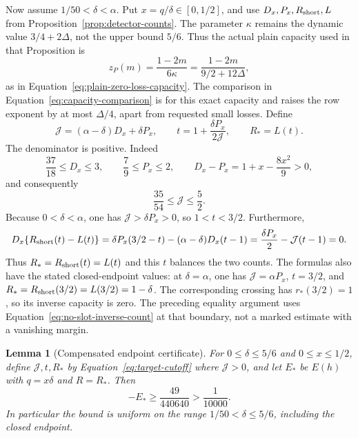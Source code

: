\documentclass[11pt,a4paper]{article}
\numberwithin{equation}{section}
\numberwithin{figure}{section}
\newtheorem{lemma}[theorem]{Lemma}
\theoremstyle{definition}
\theoremstyle{remark}
\begin{document}
Now assume \(1/50<\delta<\alpha\).  Put \(x=q/\delta\in[0,1/2]\),
and use \(D_x,P_x,R_{\rm short},L\) from
Proposition~\ref{prop:detector-counts}.  The parameter \(\kappa\)
remains the dynamic value \(3/4+2\Delta\), not the upper bound
\(5/6\).  Thus the actual plain capacity used in that Proposition is
\[
 z_P(m)=\frac{1-2m}{6\kappa}
       =\frac{1-2m}{9/2+12\Delta},
\]
as in Equation~\eqref{eq:plain-zero-loss-capacity}.  The comparison in
Equation~\eqref{eq:capacity-comparison} is for this exact capacity and
raises the row exponent by at most \(\Delta/4\), apart from requested
small losses.  Define
\begin{equation}
 \mathcal J=(\alpha-\delta)D_x+\delta P_x,\qquad
 t=1+\frac{\delta P_x}{2\mathcal J},\qquad
 R_*=L(t).
 \label{eq:target-cutoff}
\end{equation}
The denominator is positive.  Indeed
\[
 \frac{37}{18}\le D_x\le3,\qquad
 \frac79\le P_x\le2,\qquad
 D_x-P_x=1+x-\frac{8x^2}{9}>0,
\]
and consequently
\[
 \frac{35}{54}\le\mathcal J\le\frac52.
\]
Because \(0<\delta<\alpha\), one has
\(\mathcal J>\delta P_x>0\), so \(1<t<3/2\).
Furthermore,
\[
 D_x\{R_{\rm short}(t)-L(t)\}
 =\delta P_x(3/2-t)-(\alpha-\delta)D_x(t-1)
 =\frac{\delta P_x}{2}-\mathcal J(t-1)=0.
\]
Thus \(R_*=R_{\rm short}(t)=L(t)\) and this \(t\) balances the two counts.
The formulas also have the stated closed-endpoint values: at
\(\delta=\alpha\), one has \(\mathcal J=\alpha P_x\), \(t=3/2\),
and \(R_*=R_{\rm short}(3/2)=L(3/2)=1-\delta\).  The corresponding crossing
has \(r_*(3/2)=1\), so its inverse capacity is zero.  The preceding
equality argument uses Equation~\eqref{eq:no-slot-inverse-count} at
that boundary, not a marked estimate with a vanishing margin.

\begin{lemma}[Compensated endpoint certificate]\label{lem:balanced-endpoint}
For \(0\le\delta\le5/6\) and \(0\le x\le1/2\), define
\(\mathcal J,t,R_*\) by Equation~\eqref{eq:target-cutoff} where
\(\mathcal J>0\), and let \(E_*\) be \(E(h)\) with
\(q=x\delta\) and \(R=R_*\).  Then
\[
 -E_*\ge\frac{49}{440640}>\frac1{10000}.
\]
In particular the bound is uniform on the range
\(1/50<\delta\le5/6\), including the closed endpoint.
\end{lemma}
\end{document}
